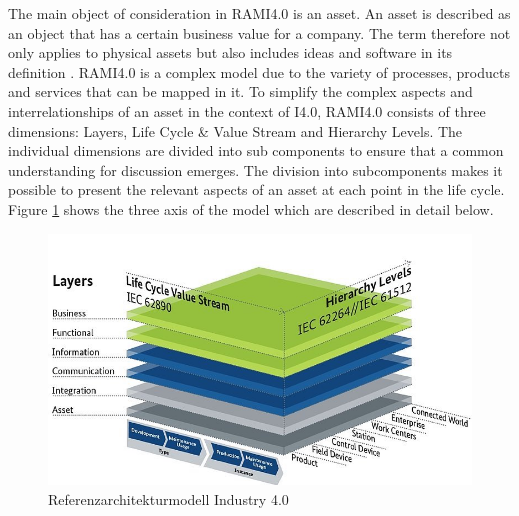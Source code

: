 The main object of consideration in \ac{RAMI4.0} is an asset. An asset is described as an object that has a certain business value for a company. The term therefore not only applies to physical assets but also includes ideas and software in its definition \cite[p. 31]{Heidel2017ReferenzarchitekturmodellIndustrie4.0Komponente}. \ac{RAMI4.0} is a complex model due to the variety of processes, products and services that can be mapped in it. To simplify the complex aspects and interrelationships of an asset in the context of \ac{I4.0}, \ac{RAMI4.0} consists of three dimensions: Layers, Life Cycle \& Value Stream and Hierarchy Levels. The individual dimensions are divided into sub components to ensure that a common understanding for discussion emerges. The division into subcomponents makes it possible to present the relevant aspects of an asset at each point in the life cycle. Figure \ref{fig:rami40} shows the three axis of the model which are described in detail below.

\begin{figure}[h]
\includegraphics[scale=0.5]{content/pictures/rami_4.0_zvei.jpg}
\caption{Referenzarchitekturmodell Industry 4.0}
\label{fig:rami40}
\end{figure}

